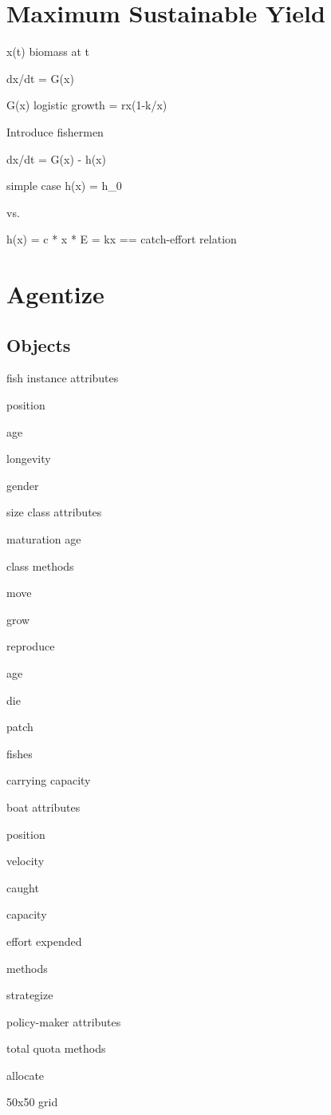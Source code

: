 

\section{Maximum Sustainable Yield}
x(t) \equiv biomass at t

dx/dt = G(x)

G(x) \equiv logistic growth = rx(1-k/x)

Introduce fishermen

dx/dt = G(x) - h(x)

simple case h(x) = h_0

vs.

h(x) = c * x * E = kx == catch-effort relation

\section{Agentize}

\subsection{Objects}

\item{fish
instance attributes
	\item{position}
	\item{age}
	\item{longevity}
	\item{gender}
	\item{size}
class attributes
	\item{maturation age}

class methods
	\item{move}
	\item{grow}
	\item{reproduce}
	\item{age}
	\item{die}
}

\item{patch
	\item{fishes}
	\item{carrying capacity}
}

\item{boat
attributes
	\item{position}
	\item{velocity}
	\item{caught}
	\item{capacity}
	\item{effort expended}

methods
	\item{strategize}
	\item{}
}

\item{policy-maker
attributes
	\item{total quota}
methods
	\item{allocate}
}
	
50x50 grid	
	

